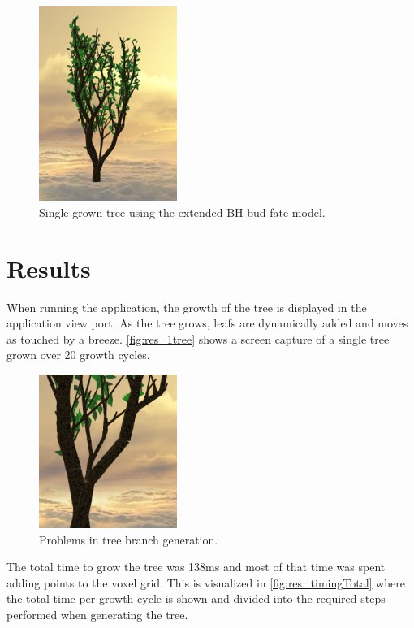 \documentclass[11pt]{article} %
\begin{document}
\begin{figure}[htp]
	\centering
	\includegraphics[width=0.4\textwidth]{1tree.png}
	\caption{Single grown tree using the extended BH bud fate model.}
	\label{fig:res_1tree}
\end{figure}

\section{Results}
When running the application, the growth of the tree is displayed in the application view port.
As the tree grows, leafs are dynamically added and moves as touched by a breeze.
\autoref{fig:res_1tree} shows a screen capture of a single tree grown over 20 growth cycles.
\begin{figure}[htp]
	\centering
	\includegraphics[width=0.4\textwidth]{treehole.png}
	\caption{Problems in tree branch generation.}
	\label{fig:res_treehole}
\end{figure}

The total time to grow the tree was 138ms and most of that time was spent adding points to the voxel grid.
This is visualized in \autoref{fig:res_timingTotal} where the total time per growth cycle is shown and divided into the required steps performed when generating the tree.
\end{document}
